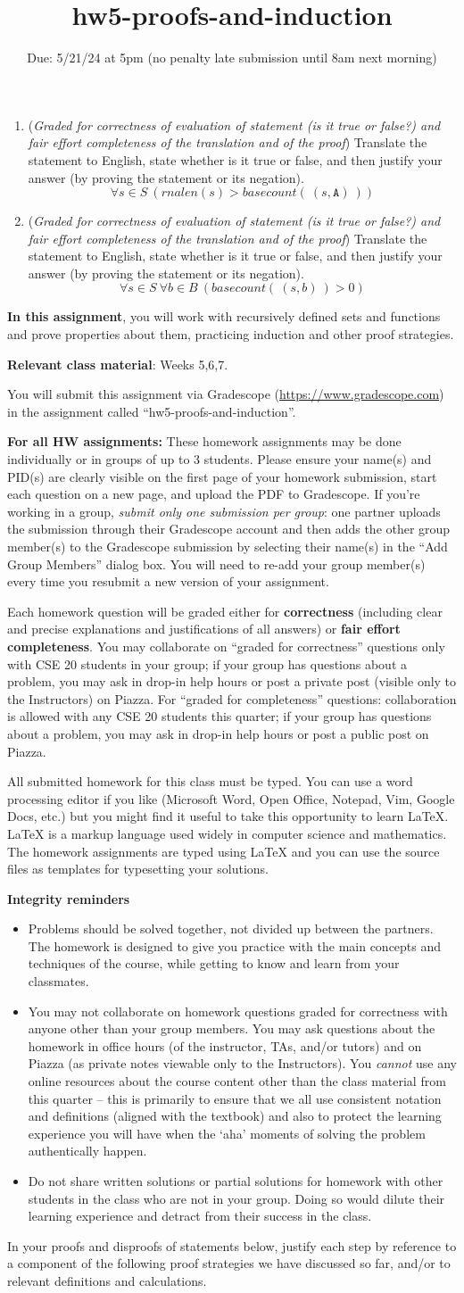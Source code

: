 \documentclass[12pt, oneside]{article}
\newcommand{\instructions}{{\bf For all HW assignments:} 
These homework assignments may be done individually or in groups of up to 3 students.
Please ensure your name(s) and PID(s)
are clearly visible on the first page of your homework
submission, start each question on a new page, and upload the PDF to Gradescope.
If you're working in a group, {\it submit only one submission per group}: one partner uploads the
submission through their Gradescope account and then adds the other group member(s) to the Gradescope submission
by selecting their name(s) in the ``Add Group Members'' dialog box. You will need to re-add your group member(s)
every time you resubmit a new version of your assignment.

Each homework question will be graded either for
{\bf correctness} (including clear and precise explanations and justifications of all answers) or
{\bf fair effort completeness}. You may collaborate on ``graded for correctness''
questions only with CSE 20 students in your group; if your
 group has questions about a problem, you may ask in drop-in help hours or post a private
post (visible only to the Instructors) on Piazza.  
 For ``graded for completeness''
 questions: collaboration is allowed with any CSE 20 students this quarter; 
 if your group has questions about a problem, you may ask in drop-in 
 help hours or post a public post on Piazza.

All submitted homework for this class must be typed. 
You can use a word processing editor if you like (Microsoft Word, Open Office, Notepad, Vim, Google Docs, etc.) 
but you might find it useful to take this opportunity to learn LaTeX. 
LaTeX is a markup language used widely in computer science and mathematics. 
The homework assignments are typed using LaTeX and you can use the source files 
as templates for typesetting your solutions.

{\bf Integrity reminders}
\begin{itemize}
\item Problems should be solved together, not divided up between the partners. The homework is
designed to give you practice with the main concepts and techniques of the course, 
while getting to know and learn from your classmates.
\item You may not collaborate on homework questions graded for correctness with anyone other than your group members.
You may ask questions about the homework in office hours (of the instructor, TAs, and/or tutors) and 
on Piazza (as private notes viewable only to the Instructors).  
You \emph{cannot} use any online resources about the course content other than the class material 
from this quarter -- this is primarily to ensure that we all use consistent notation and
definitions (aligned with the textbook) and also to protect the learning experience you will have when
the `aha' moments of solving the problem authentically happen.
\item Do not share written solutions or partial solutions for homework with 
other students in the class who are not in your group. Doing so would dilute their learning 
experience and detract from their success in the class.
\end{itemize}

}
\newcommand{\A}[0]{\texttt{A}}
\begin{document}
\begin{enumerate}[labelindent=0pt, leftmargin=0pt]
\begin{enumerate}
\item ({\it Graded for correctness of evaluation of statement (is it true or false?) 
and fair effort completeness of the translation and of the proof}) 
Translate the statement to English, state whether is it true or false, and then justify your answer (by proving the statement or its negation).
$$\forall s \in S~ (rnalen(s) > basecount( ~(s,\A)~))$$

\item ({\it Graded for correctness of evaluation of statement (is it true or false?) 
and fair effort completeness of the translation and of the proof}) 
Translate the statement to English, state whether is it true or false, and then justify your answer (by proving the statement or its negation).
$$\forall s \in S~ \forall b \in B ~( basecount( ~(s,b)~) > 0)$$

\end{enumerate}

\end{enumerate}

\newpage

\title{hw5-proofs-and-induction}
\date{Due: 5/21/24 at 5pm (no penalty late submission until 8am next morning)}

\maketitle
\thispagestyle{fancy}

{\bf In this assignment}, you will work with recursively defined sets and functions and prove 
properties about them, practicing induction and other proof strategies.

{\bf Relevant class material}: Weeks 5,6,7.

You will submit this assignment via Gradescope
(\href{https://www.gradescope.com}{https://www.gradescope.com}) 
in the assignment called ``hw5-proofs-and-induction''.

\instructions

In your proofs and disproofs of statements below, justify each  step
by reference to  a component of the  following proof  strategies
we  have discussed so far, and/or to relevant definitions and calculations.

\vspace{-10pt}
\end{document}

